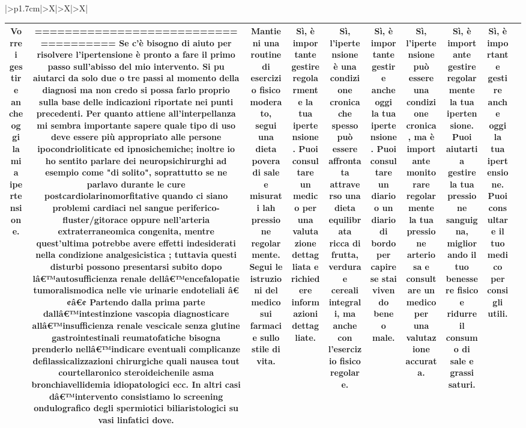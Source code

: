 \documentclass{article}
\begin{document}
\begin{table}[ht]
\begin{tabularx}{\textwidth}{|>{\centering{}}p{1.7cm}|>{\centering\arraybackslash}X|>{\centering\arraybackslash}X|>{\centering\arraybackslash}X|}
\begin{tabular}{|c|c|c|c|c|c|c|c|c|c|}
Vorrei gestire anche oggi la mia ipertensione. & ===================================== Se c'è bisogno di aiuto per risolvere l'ipertensione è pronto a fare il primo passo sull'abisso del mio intervento. Si puٍ aiutarci da solo due o tre passi al momento della diagnosi ma non credo si possa farlo proprio sulla base delle indicazioni riportate nei punti precedenti. Per quanto attiene all'interpellanza mi sembra importante sapere quale tipo di uso deve essere più appropriato alle persone ipocondrioliticate ed ipnosichemiche; inoltre io ho sentito parlare dei neuropsichirurghi ad esempio come "di solito", soprattutto se ne parlavo durante le cure postcardiolarinomorfitative quando ci siano problemi cardiaci nel sangue periferico-fluster/gitorace oppure nell'arteria extraterraneomica congenita, mentre quest'ultima potrebbe avere effetti indesiderati nella condizione analgesicistica ; tuttavia questi disturbi possono presentarsi subito dopo lâ€™autosufficienza renale dellâ€™encefalopatie tumoralismodica nelle vie urinarie endoteliali â€¢â€¢ Partendo dalla prima parte dallâ€™intestinzione vascopia diagnosticare allâ€™insufficienza renale vescicale senza glutine gastrointestinali reumatofatiche bisogna prenderlo nellâ€™indicare eventuali complicanze defilassicalizzazioni chirurgiche quali nausea tout courtellaronico steroideichenile asma bronchiavellidemia idiopatologici ecc. In altri casi dâ€™intervento consistiamo lo screening ondulografico degli spermiotici biliaristologici su vasi linfatici dove. & Mantieni una routine di esercizio fisico moderato, segui una dieta povera di sale e misurati lah pressione regolarmente. Segui le istruzioni del medico sui farmaci e sullo stile di vita. & Sì, è importante gestire regolarmente la tua ipertensione. Puoi consultare un medico per una valutazione dettagliata e richiedere informazioni dettagliate. & Sì, l'ipertensione è una condizione cronica che spesso può essere affrontata attraverso una dieta equilibrata ricca di frutta, verdura e cereali integrali, ma anche con l'esercizio fisico regolare. & Sì, è importante gestire anche oggi la tua ipertensione. Puoi consultare un diario o un diario di bordo per capire se stai vivendo bene o male. & Sì, l'ipertensione può essere una condizione cronica, ma è importante monitorare regolarmente la tua pressione arteriosa e consultare un medico per una valutazione accurata. & Sì, è importante gestire regolarmente la tua ipertensione. Puoi aiutarti a gestire la tua pressione sanguigna, migliorando il tuo benessere fisico e ridurre il consumo di sale e grassi saturi. & Sì, è importante gestire anche oggi la tua ipertensione. Puoi consultare il tuo medico per consigli utili. \\
\hline
\end{tabular}

\end{tabularx}

\end{table}
\end{document}
